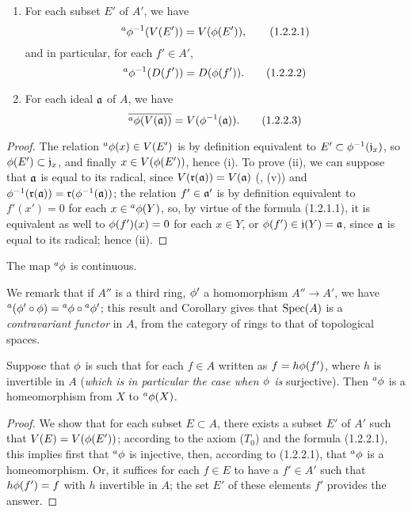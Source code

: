 \begin{prop}[1.2.2]
\label{1.1.2.2}
\medskip\noindent
\begin{enumerate}[label=\emph{(\roman*)}]
  \item For each subset $E'$ of $A'$, we have
    \[
      {}^a\phi^{-1}(V(E'))=V(\phi(E')),
      \tag{1.2.2.1}
    \]
    and in particular, for each $f'\in A'$,
    \[
      {}^a\phi^{-1}(D(f'))=D(\phi(f')).
      \tag{1.2.2.2}
    \]
  \item For each ideal $\mathfrak{a}$ of $A$, we have
    \[
      \overline{{}^a\phi(V(\mathfrak{a}))}=V(\phi^{-1}(\mathfrak{a})).
      \tag{1.2.2.3}
    \]
\end{enumerate}
\end{prop}

\begin{proof}
\label{proof-1.1.2.2}
The relation ${}^a\phi(x)\in V(E')$ is by definition equivalent to
$E'\subset\phi^{-1}(\mathfrak{j}_x)$, so $\phi(E')\subset\mathfrak{j}_x$, and
finally $x\in V(\phi(E'))$, hence (i). To prove (ii), we can suppose that
$\mathfrak{a}$ is equal to its radical, since $V(\mathfrak{r}(\mathfrak{a}))=V(\mathfrak{a})$
(, (v)) and
$\phi^{-1}(\mathfrak{r}(\mathfrak{a}))=\mathfrak{r}(\phi^{-1}(\mathfrak{a}))$; the relation
$f'\in\mathfrak{a}'$ is by definition equivalent to $f'(x')=0$ for each
$x\in{{}^a\phi(Y)}$, so, by virtue of the formula (1.2.1.1), it is equivalent as well
to $\phi(f')(x)=0$ for each $x\in Y$, or $\phi(f')\in\mathfrak{j}(Y)=\mathfrak{a}$,
since $\mathfrak{a}$ is equal to its radical; hence (ii).
\end{proof}

\begin{cor}[1.2.3]
\label{1.1.2.3}
The map ${}^a\phi$ is continuous.
\end{cor}

We remark that if $A''$ is a third ring, $\phi'$ a homomorphism $A''\to A'$, we have
${}^a(\phi'\circ\phi)={}^a\phi\circ{}^a\phi'$; this result and Corollary
 gives that ${\mathop{\mathrm{Spec}}\nolimits}(A)$ is a \emph{contravariant functor} in $A$, from the
category of rings to that of topological spaces.

\begin{cor}[1.2.4]
\label{1.1.2.4}
Suppose that $\phi$ is such that for each $f\in A$ written as $f=h\phi(f')$, where $h$ is
invertible in $A$ (\emph{which is in particular the case when $\phi$ is} surjective). Then
${}^a\phi$ is a homeomorphism from $X$ to ${}^a\phi(X)$.
\end{cor}

\begin{proof}
\label{proof-1.1.2.4}
We show that for each subset $E\subset A$, there exists a subset $E'$ of $A'$ such that
$V(E)=V(\phi(E'))$; according to the axiom ($T_0$)  and the formula
(1.2.2.1), this implies first that ${}^a\phi$ is injective, then, according to (1.2.2.1),
that ${}^a\phi$ is a homeomorphism. Or, it suffices for each $f\in E$ to have a $f'\in A'$
such that $h\phi(f')=f$ with $h$ invertible in $A$; the set $E'$ of these elements $f'$
provides the answer.
\end{proof}

